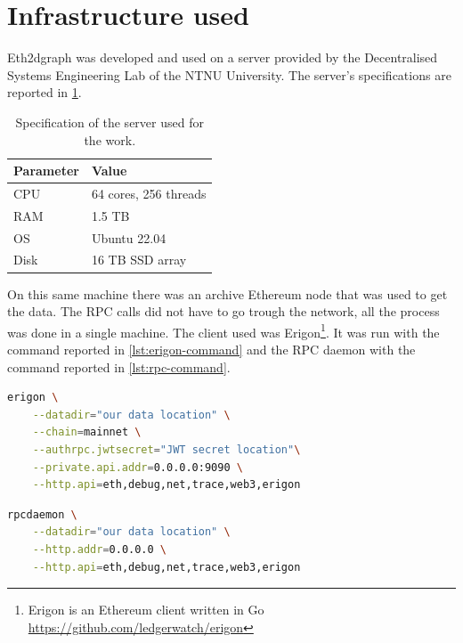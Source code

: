 \label{chapter-5}

\section{Infrastructure used}

Eth2dgraph was developed and used on a server provided by the Decentralised Systems Engineering Lab of the NTNU University. The server's specifications are reported in \cref{table:server-specs}.

\begin{table}[ht!]
\centering
    \begin{threeparttable}
    \begin{tabular}  { m{3cm} m{6cm} } 
    \toprule
    \textbf{Parameter} & \textbf{Value}   \\
    \midrule
    CPU    &    64 cores, 256 threads \\[1.3ex]
    RAM    &    1.5 TB \\[1.3ex]
    OS    &     Ubuntu 22.04 \\[1.3ex]
    Disk    &   16 TB SSD array \\[1.3ex]
    \bottomrule
    \end{tabular}
    \end{threeparttable}
\caption[Specification of the server used for the work]{Specification of the server used for the work.}
\label{table:server-specs}
\end{table}

On this same machine there was an archive Ethereum node that was used to get the data. The RPC calls did not have to go trough the network, all the process was done in a single machine. The client used was Erigon\footnote{Erigon is an Ethereum client written in Go \url{https://github.com/ledgerwatch/erigon}}. It was run with the command reported in \cref{lst:erigon-command} and the RPC daemon with the command reported in \cref{lst:rpc-command}.

\begin{lstlisting}[language=bash,caption={Erigon command},label={lst:erigon-command},captionpos=b,numbers=none]
erigon \
    --datadir="our data location" \
    --chain=mainnet \
    --authrpc.jwtsecret="JWT secret location"\
    --private.api.addr=0.0.0.0:9090 \
    --http.api=eth,debug,net,trace,web3,erigon
\end{lstlisting}

\begin{lstlisting}[language=bash,caption={RPC daemon command},label={lst:rpc-command},captionpos=b,numbers=none]
rpcdaemon \
    --datadir="our data location" \
    --http.addr=0.0.0.0 \
    --http.api=eth,debug,net,trace,web3,erigon
\end{lstlisting}

